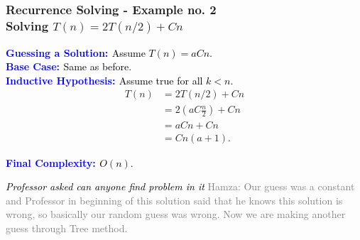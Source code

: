 \begin{frame}\frametitle{Recurrence Solving - Example no. 2\\ \small {Solving $T(n) = 2T(n/2) + Cn$}}
    \textbf{\textcolor{blue}{Guessing a Solution: }} \textcolor{black} { Assume $T(n) = a C n$.} \\[8pt]

    \textbf{\textcolor{blue}{Base Case: }} \textcolor{black}{ Same as before.} \\[8pt]

    \textbf{\textcolor{blue}{Inductive Hypothesis:   }} \textcolor{black} {Assume true for all $k < n$.} \\[8pt]


    \begin{align*}
        T(n) &= 2T(n/2) + Cn \\
             &= 2 \left( a C \frac{n}{2} \right) + Cn \\
             &= a C n + Cn \\
             &= C n (a + 1).
    \end{align*}

    \textbf{\textcolor{blue}{Final Complexity:    }} \textcolor{black} {$O(n)$.}
\vspace{0.4cm}


 \textit{\textcolor{black}{Professor asked can anyone find problem in it}}
    {\textcolor{gray}{Hamza: Our guess was a constant and Professor in beginning of this solution said that he knows this solution is wrong, so basically our random guess was wrong. Now we are making another guess through Tree method.}}

\end{frame}


